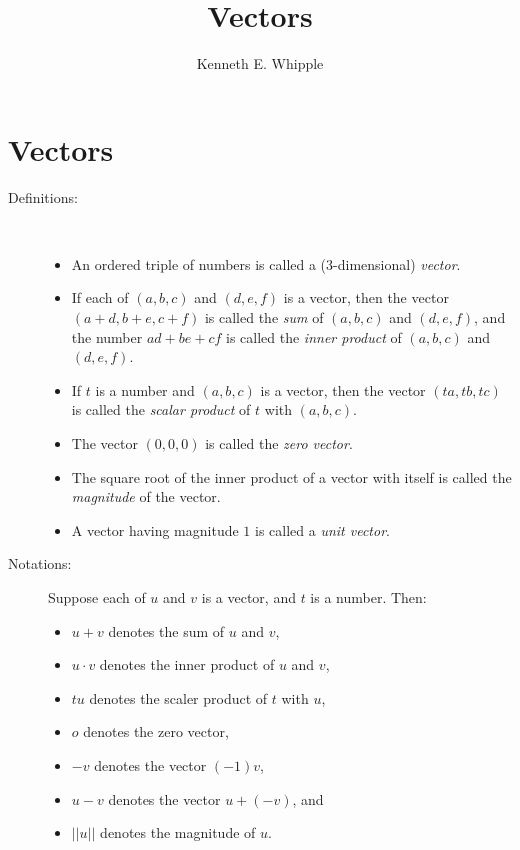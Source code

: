 \documentclass{article}
\let\titlepageAuthor\author
\renewcommand{\author}[1]{\newcommand{\headerAuthor}{#1}\titlepageAuthor{#1}}
\let\titlepageTitle\title
\renewcommand{\title}[1]{\newcommand{\headerTitle}{#1}\titlepageTitle{#1}}
\begin{document}
\title{Vectors}
\author{Kenneth E. Whipple}
\date{}
\maketitle
\thispagestyle{empty}



\newpage

\setcounter{tocdepth}{3} 
\tableofcontents
\thispagestyle{empty}


\newpage

\section{Vectors}


\begin{description}

  \item[Definitions:] $\ $
    \begin{itemize}
      \item An ordered triple of numbers is called a ($3$-dimensional) \emph{vector}.
      \item If each of $(a,b,c)$ and $(d,e,f)$ is a vector, then the vector $(a+d,b+e,c+f)$ is called the \emph{sum} of $(a,b,c)$ and $(d,e,f)$, and the number $ad+be+cf$ is called the \emph{inner product} of $(a,b,c)$ and $(d,e,f)$.
      \item If $t$ is a number and $(a,b,c)$ is a vector, then the vector $(ta,tb,tc)$ is called the \emph{scalar product} of $t$ with $(a,b,c)$. 
      \item The vector $(0,0,0)$ is called the \emph{zero vector}. 
      \item The square root of the inner product of a vector with itself is called the \emph{magnitude} of the vector. 
      \item A vector having magnitude $1$ is called a \emph{unit vector}.
    \end{itemize}

  \item[Notations:] Suppose each of $u$ and $v$ is a vector, and $t$ is a number. Then:
    \begin{itemize}
      \item $u+v$ denotes the sum of $u$ and $v$,
      \item $u \cdot v$ denotes the inner product of $u$ and $v$,
      \item $tu$ denotes the scaler product of $t$ with $u$,
      \item $o$ denotes the zero vector,
      \item $-v$ denotes the vector $(-1)v$,
      \item $u-v$ denotes the vector $u+(-v)$, and
      \item $\vert \vert u \vert \vert$ denotes the magnitude of $u$.
    \end{itemize}
    

\end{description}
\end{document}
